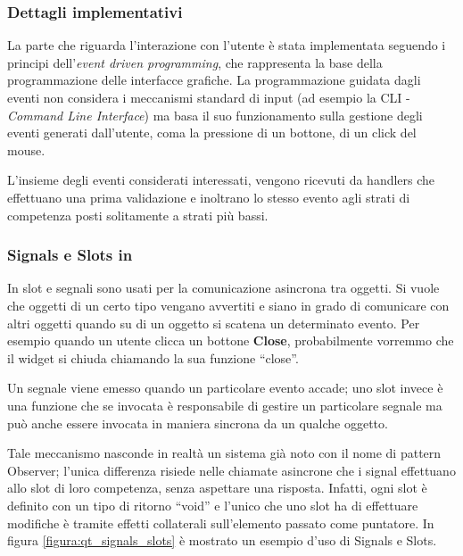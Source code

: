 \subsubsection*{Dettagli implementativi}
La parte che riguarda l'interazione con l'utente è stata implementata seguendo i principi dell'\emph{event driven programming}, che rappresenta la base della programmazione delle interfacce grafiche. La programmazione guidata dagli eventi non considera i meccanismi standard di input (ad esempio la CLI - \emph{Command Line Interface}) ma basa il suo funzionamento sulla gestione degli eventi generati dall'utente, coma la pressione di un bottone, di un click del mouse. 

L'insieme degli eventi considerati interessati, vengono ricevuti da handlers che effettuano una prima validazione e inoltrano lo stesso evento agli strati di competenza posti solitamente a strati più bassi.

\subsubsection*{Signals e Slots in \qt{}}
In \qt{} slot e segnali sono usati per la comunicazione asincrona tra oggetti.
Si vuole che oggetti di un certo tipo vengano avvertiti e siano in grado di comunicare con altri oggetti quando su di un oggetto si scatena un determinato evento. Per esempio quando un utente clicca un bottone \textbf{Close}, probabilmente vorremmo che il widget si chiuda chiamando la sua funzione ``close''.

Un segnale viene emesso quando un particolare evento accade; uno slot invece è una funzione che se invocata è responsabile di gestire un particolare segnale ma può anche essere invocata in maniera sincrona da un qualche oggetto.

Tale meccanismo nasconde in realtà un sistema già noto con il nome di pattern Observer; l'unica differenza risiede nelle chiamate asincrone che i signal effettuano allo slot di loro competenza, senza aspettare una risposta. Infatti, ogni slot è definito con un tipo di ritorno ``void'' e l'unico che uno slot ha di effettuare modifiche è tramite effetti collaterali sull'elemento passato come puntatore. In figura \ref{figura:qt_signals_slots} è mostrato un esempio d'uso di Signals e Slots.

